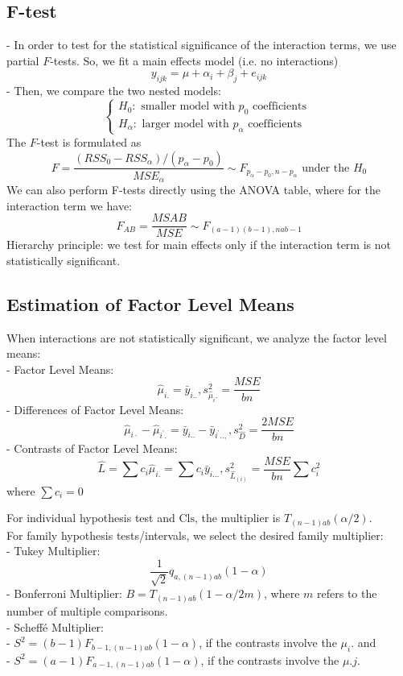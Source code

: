 \documentclass[11pt,a4paper]{article}
\begin{document}
\subsection{F-test}
- In order to test for the statistical significance of the interaction terms, we use partial $F$-tests. So, we fit a main effects model (i.e. no interactions)
$$
y_{i j k}=\mu+\alpha_{i}+\beta_{j}+e_{i j k}
$$
- Then, we compare the two nested models:
$$
\left\{\begin{array}{l}
H_{0}: \text { smaller model with } p_{0} \text { coefficients } \\
H_{\alpha}: \text { larger model with } p_{\alpha} \text { coefficients }
\end{array}\right.
$$
The $F$-test is formulated as
$$
F=\frac{\left(R S S_{0}-R S S_{\alpha}\right) /\left(p_{\alpha}-p_{0}\right)}{M S E_{\alpha}} \sim F_{p_{\alpha}-p_{0}, n-p_{\alpha}} \text { under the } H_{0}
$$
We can also perform F-tests directly using the ANOVA table, where for the interaction term we have:
$$F_{AB}=\frac{MSAB}{MSE}\sim F_{(a-1)(b-1),nab-1}$$
Hierarchy principle: we test for main effects only if the interaction term is not statistically significant.

\subsection{Estimation of Factor Level Means}
When interactions are not statistically significant, we analyze the factor level means:\\
- Factor Level Means: $$\hat{\mu}_{i.}=\bar{y}_{i. .}, s_{\hat{\mu}_{i} .}^{2}=\frac{M S E}{b n}$$
- Differences of Factor Level Means:
$$
\hat{\mu}_{i \cdot}-\hat{\mu}_{i^{\prime} .}=\bar{y}_{i . .}-\bar{y}_{i^{\prime} . .,}, s_{\hat{D}}^{2}=\frac{2 M S E}{b n}
$$
- Contrasts of Factor Level Means:
$$
\hat{L}=\sum c_{i} \hat{\mu}_{i .}=\sum c_{i} \bar{y}_{i . . .}, s_{\hat{L}_{(i)}}^{2}=\frac{M S E}{b n} \sum c_{i}^{2}
$$
where $\sum c_{i}=0$

For individual hypothesis test and $\mathrm{Cls}$, the multiplier is $T_{(n-1) a b}(\alpha / 2)$.\\
For family hypothesis tests/intervals, we select the desired family multiplier:\\
- Tukey Multiplier: $$\frac{1}{\sqrt{2}} q_{a,(n-1) a b}(1-\alpha)$$
- Bonferroni Multiplier: $B=T_{(n-1) a b}(1-\alpha / 2 m)$, where $m$ refers to the number of multiple comparisons.\\
- Scheffé Multiplier:\\
- $S^{2}=(b-1) F_{b-1,(n-1) a b}(1-\alpha)$, if the contrasts involve the $\mu_{i}$. and\\
- $S^{2}=(a-1) F_{a-1,(n-1) a b}(1-\alpha)$, if the contrasts involve the $\mu . j$.
\end{document}
